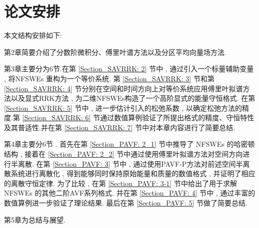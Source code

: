 \section{论文安排}
本文结构安排如下:

第2章简要介绍了分数阶微积分、傅里叶谱方法以及分区平均向量场方法.

第3章主要分为6节.在第 \ref{Section_SAVRRK: 2} 节中 , 通过引入一个标量辅助变量 , 将NFSWEs  重构为一个等价系统.
第 \ref{Section_SAVRRK: 3} 节和第 \ref{Section_SAVRRK: 4} 节分别在空间和时间方向上对等价系统应用傅里叶拟谱方法以及显式RRK方法 , 为二维NFSWEs构造了一个高阶显式的能量守恒格式.
在第 \ref{Section_SAVRRK: 5} 节中 , 进一步估计引入的松弛系数 , 以确定松弛方法的精度.第 \ref{Section_SAVRRK: 6} 节通过数值算例验证了所提出格式的精度、守恒特性及其普适性.并在第 \ref{Section_SAVRRK: 7} 节中对本章内容进行了简要总结.

第4章主要分6节 . 首先在第 \ref{Section_PAVF: 2_1} 节中推导了 NFSWEs 的哈密顿结构 , 接着在 \ref{Section_PAVF: 2_2} 节中通过使用傅里叶拟谱方法对空间方向进行半离散.
在第 \ref{Section_PAVF: 3} 节中 , 通过使用PAVF-P方法对前述空间半离散系统进行离散化 , 得到能够同时保持原始能量和质量的数值格式 , 并证明了相应的离散守恒定律.
为了比较 , 在第 \ref{Section_PAVF: 3-1} 节中给出了用于求解NFSWEs  的其他二阶AVF系列格式.
并在第 \ref{Section_PAVF: 4} 节中 , 通过丰富的数值算例进一步验证了理论结果.
最后在第 \ref{Section_PAVF: 5} 节做了简要总结.

第5章为总结与展望.